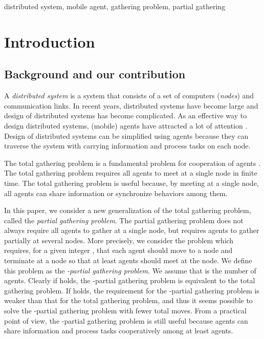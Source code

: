 \documentclass[preprint,12pt]{elsarticle}
\begin{document}
\begin{frontmatter}
\begin{abstract}
\end{abstract}

\begin{keyword}
distributed system, mobile agent, gathering problem, partial gathering


\end{keyword}

\end{frontmatter}



\section{Introduction}
\label{intro}

\subsection{Background and our contribution}
\label{background}

A {\em distributed system} is a system that consists of a set of computers ({\em nodes})  and communication links.
In recent years, distributed systems have become large and design of distributed systems has become complicated.
As an effective way to design distributed systems, (mobile) agents have attracted a lot of attention \cite{gathering}.
Design of distributed systems can be simplified using agents because they can traverse the system with carrying information and process tasks on each node.

The total gathering problem is a fundamental problem for cooperation of agents \cite{gathering,token1,token2}. 
The total gathering problem requires all agents to meet at a single node in finite time. 
The total gathering problem is useful because, by meeting at a single node, all agents can share information or synchronize behaviors among them.

In this paper, we consider a new generalization of the total gathering problem, called the {\em partial gathering problem}. The partial gathering problem does not always require all agents to gather at a single node, but requires agents to gather partially at several nodes. More precisely, we consider the problem which requires, for a given integer  , that each agent should move to a node and terminate at a node so that at least  agents should meet at the node.
We define this problem as the {\em -partial gathering problem}. 
We assume that  is the number of agents. 
Clearly if  holds, the -partial gathering problem is equivalent to the total gathering problem. If  holds, the requirement for the -partial gathering problem is weaker than that for the total gathering problem, and thus it seems possible to solve the -partial gathering problem with fewer total moves. From a practical point of view, the -partial gathering problem is still useful because agents can share information and process tasks cooperatively among at least  agents.
\end{document}
